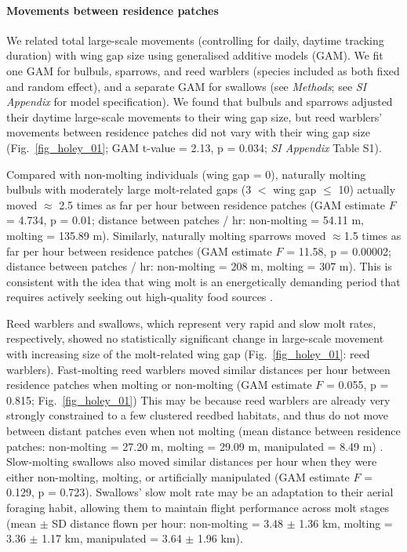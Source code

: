 \begin{refsection}
\paragraph*{Movements between residence patches}

We related total large-scale movements (controlling for daily, daytime tracking duration) with wing gap size using generalised additive models (GAM).
We fit one GAM for bulbuls, sparrows, and reed warblers (species included as both fixed and random effect), and a separate GAM for swallows (see \textit{Methods}; see \textit{SI Appendix} for model specification).
We found that bulbuls and sparrows adjusted their daytime large-scale movements to their wing gap size, but reed warblers' movements between residence patches did not vary with their wing gap size (Fig.~\ref{fig_holey_01}; GAM t-value = 2.13, p = 0.034; \textit{SI Appendix} Table S1).

Compared with non-molting individuals (wing gap = 0), naturally molting bulbuls with moderately large molt-related gaps (3 $<$ wing gap $\leq$ 10) actually moved $\approx$ 2.5 times as far per hour between residence patches (GAM estimate $F$ = 4.734, p = 0.01; distance between patches / hr: non-molting = 54.11 m, molting = 135.89 m).
Similarly, naturally molting sparrows moved {$\approx$1.5 times} as far per hour between residence patches (GAM estimate $F$ = 11.58, p = 0.00002; distance between patches / hr: non-molting = 208 m, molting = 307 m).
This is consistent with the idea that wing molt is an energetically demanding period that requires actively seeking out high-quality food sources \citep{madsen1987,fox1998}.

Reed warblers and swallows, which represent very rapid and slow molt rates, respectively, showed no statistically significant change in large-scale movement with increasing size of the molt-related wing gap (Fig.~\ref{fig_holey_01}: reed warblers).
Fast-molting reed warblers moved similar distances per hour between residence patches when molting or non-molting (GAM estimate $F$ = 0.055, p = 0.815; Fig.~\ref{fig_holey_01})
This may be because reed warblers are already very strongly constrained to a few clustered reedbed habitats, and thus do not move between distant patches even when not molting (mean distance between residence patches: non-molting = 27.20 m, molting = 29.09 m, manipulated = 8.49 m) \citep{kiat2016}.
Slow-molting swallows also moved similar distances per hour when they were either non-molting, molting, or artificially manipulated (GAM estimate $F$ = 0.129, p = 0.723).
Swallows' slow molt rate may be an adaptation to their aerial foraging habit, allowing them to maintain flight performance across molt stages (mean $\pm$ SD distance flown per hour: non-molting = 3.48 $\pm$ 1.36 km, molting = 3.36 $\pm$ 1.17 km, manipulated = 3.64 $\pm$ 1.96 km).


\end{refsection}
